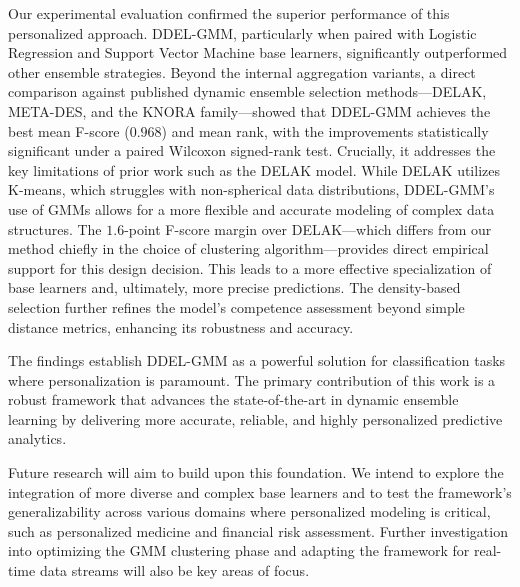 \documentclass[lettersize,journal]{IEEEtran}
\newcommand{\tfourhighlight}[1]{\textcolor{tier4blue}{#1}}
\begin{document}
	Our experimental evaluation confirmed the superior performance of this personalized approach. DDEL-GMM, particularly when paired with Logistic Regression and Support Vector Machine base learners, significantly outperformed other ensemble strategies. \tfourhighlight{Beyond the internal aggregation variants, a direct comparison against published dynamic ensemble selection methods—DELAK, META-DES, and the KNORA family—showed that DDEL-GMM achieves the best mean F-score ($0.968$) and mean rank, with the improvements statistically significant under a paired Wilcoxon signed-rank test. Crucially, it addresses the key limitations of prior work such as the DELAK model. While DELAK utilizes K-means, which struggles with non-spherical data distributions, DDEL-GMM's use of GMMs allows for a more flexible and accurate modeling of complex data structures. The $1.6$-point F-score margin over DELAK—which differs from our method chiefly in the choice of clustering algorithm—provides direct empirical support for this design decision.} This leads to a more effective specialization of base learners and, ultimately, more precise predictions. The density-based selection further refines the model's competence assessment beyond simple distance metrics, enhancing its robustness and accuracy.
	
	The findings establish DDEL-GMM as a powerful solution for classification tasks where personalization is paramount. The primary contribution of this work is a robust framework that advances the state-of-the-art in dynamic ensemble learning by delivering more accurate, reliable, and highly personalized predictive analytics.
	
	Future research will aim to build upon this foundation. We intend to explore the integration of more diverse and complex base learners and to test the framework’s generalizability across various domains where personalized modeling is critical, such as personalized medicine and financial risk assessment. Further investigation into optimizing the GMM clustering phase and adapting the framework for real-time data streams will also be key areas of focus.
	
	
	
	
\end{document}
